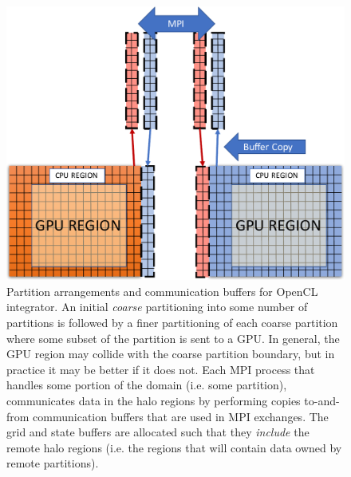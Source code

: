 \documentclass[11pt]{article}
\begin{document}
\begin{figure}[h]
\begin{center}
\includegraphics[width=\textwidth]{Figures/Lukas1}
\vspace{-20pt}
\caption{Partition arrangements and communication buffers for OpenCL integrator. An initial \textit{coarse} partitioning into some number of partitions is followed by a finer partitioning of each coarse partition where some subset of the partition is sent to a GPU. In general, the GPU region may collide with the coarse partition boundary, but in practice it may be better if it does not. Each MPI process that handles some portion of the domain (i.e. some partition), communicates data in the halo regions by performing copies to-and-from communication buffers that are used in MPI exchanges. The grid and state buffers are allocated such that they \textit{include} the remote halo regions (i.e. the regions that will contain data owned by remote partitions).}\label{Figure:Lukas1}
\end{center}
\end{figure}
\end{document}
